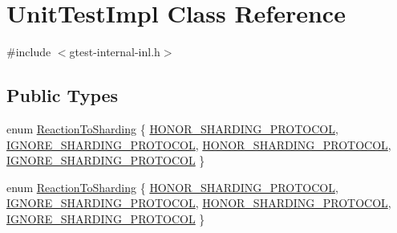 \hypertarget{classtesting_1_1internal_1_1UnitTestImpl}{\section{\-Unit\-Test\-Impl \-Class \-Reference}
\label{d0/de3/classtesting_1_1internal_1_1UnitTestImpl}
}


{\ttfamily \#include $<$gtest-\/internal-\/inl.\-h$>$}

\subsection*{\-Public \-Types}
\begin{DoxyCompactItemize}
\item 
enum \hyperlink{classtesting_1_1internal_1_1UnitTestImpl_ac8d671a300e2bd293e21f8ad1612543c}{\-Reaction\-To\-Sharding} \{ \hyperlink{classtesting_1_1internal_1_1UnitTestImpl_ac8d671a300e2bd293e21f8ad1612543ca6f368a6bc21fd5d834c62e4624353e3b}{\-H\-O\-N\-O\-R\-\_\-\-S\-H\-A\-R\-D\-I\-N\-G\-\_\-\-P\-R\-O\-T\-O\-C\-O\-L}, 
\hyperlink{classtesting_1_1internal_1_1UnitTestImpl_ac8d671a300e2bd293e21f8ad1612543cab68bd993c6f106edad941b182a42c36a}{\-I\-G\-N\-O\-R\-E\-\_\-\-S\-H\-A\-R\-D\-I\-N\-G\-\_\-\-P\-R\-O\-T\-O\-C\-O\-L}, 
\hyperlink{classtesting_1_1internal_1_1UnitTestImpl_ac8d671a300e2bd293e21f8ad1612543ca6f368a6bc21fd5d834c62e4624353e3b}{\-H\-O\-N\-O\-R\-\_\-\-S\-H\-A\-R\-D\-I\-N\-G\-\_\-\-P\-R\-O\-T\-O\-C\-O\-L}, 
\hyperlink{classtesting_1_1internal_1_1UnitTestImpl_ac8d671a300e2bd293e21f8ad1612543cab68bd993c6f106edad941b182a42c36a}{\-I\-G\-N\-O\-R\-E\-\_\-\-S\-H\-A\-R\-D\-I\-N\-G\-\_\-\-P\-R\-O\-T\-O\-C\-O\-L}
 \}
\item 
enum \hyperlink{classtesting_1_1internal_1_1UnitTestImpl_ac8d671a300e2bd293e21f8ad1612543c}{\-Reaction\-To\-Sharding} \{ \hyperlink{classtesting_1_1internal_1_1UnitTestImpl_ac8d671a300e2bd293e21f8ad1612543ca6f368a6bc21fd5d834c62e4624353e3b}{\-H\-O\-N\-O\-R\-\_\-\-S\-H\-A\-R\-D\-I\-N\-G\-\_\-\-P\-R\-O\-T\-O\-C\-O\-L}, 
\hyperlink{classtesting_1_1internal_1_1UnitTestImpl_ac8d671a300e2bd293e21f8ad1612543cab68bd993c6f106edad941b182a42c36a}{\-I\-G\-N\-O\-R\-E\-\_\-\-S\-H\-A\-R\-D\-I\-N\-G\-\_\-\-P\-R\-O\-T\-O\-C\-O\-L}, 
\hyperlink{classtesting_1_1internal_1_1UnitTestImpl_ac8d671a300e2bd293e21f8ad1612543ca6f368a6bc21fd5d834c62e4624353e3b}{\-H\-O\-N\-O\-R\-\_\-\-S\-H\-A\-R\-D\-I\-N\-G\-\_\-\-P\-R\-O\-T\-O\-C\-O\-L}, 
\hyperlink{classtesting_1_1internal_1_1UnitTestImpl_ac8d671a300e2bd293e21f8ad1612543cab68bd993c6f106edad941b182a42c36a}{\-I\-G\-N\-O\-R\-E\-\_\-\-S\-H\-A\-R\-D\-I\-N\-G\-\_\-\-P\-R\-O\-T\-O\-C\-O\-L}
 \}
\end{DoxyCompactItemize}
